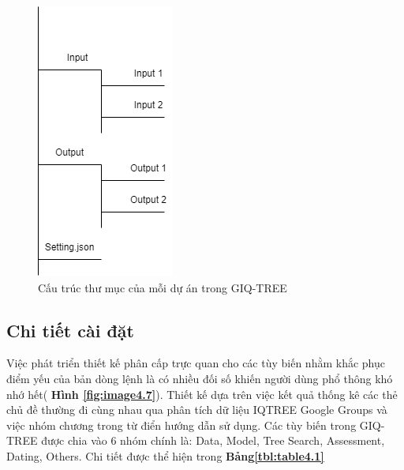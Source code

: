 \documentclass[12pt]{report}
\begin{document}
\begin{figure}[h]
	\centering
	\includegraphics[scale=1]{Image/4.6.png}
	\caption{Cấu trúc thư mục của mỗi dự án trong GIQ-TREE }
	\label{fig:image4.6}
\end{figure}

\subsection{Chi tiết cài đặt}
Việc phát triển thiết kế phân cấp trực quan cho các tùy biến nhằm khắc phục điểm yếu của bản dòng lệnh là có nhiều đối số khiến người dùng phổ thông khó nhớ hết( \textbf{Hình \ref{fig:image4.7}}). Thiết kế dựa trên việc kết quả thống kê các thẻ chủ đề thường đi cùng nhau qua phân tích dữ liệu IQTREE Google Groups và việc nhóm chương trong từ điển hướng dẫn sử dụng. Các tùy biến trong GIQ-TREE được chia vào 6 nhóm chính là: Data, Model, Tree Search, Assessment, Dating, Others. Chi tiết được thể hiện trong  \textbf{
Bảng\ref{tbl:table4.1}}
\end{document}
